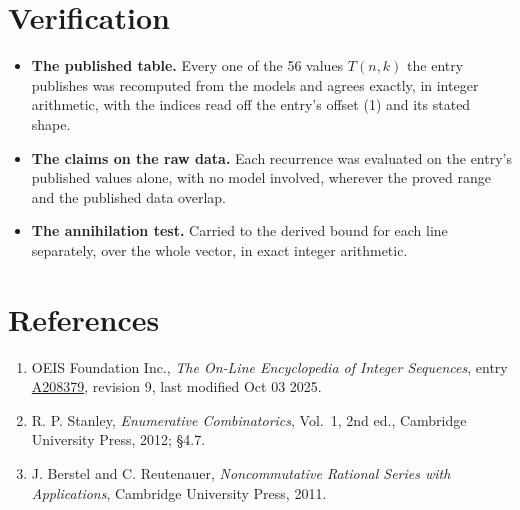 \documentclass[11pt]{article}
\theoremstyle{definition}
\begin{document}
\section{Verification}

\begin{itemize}

\item {\bfseries The published table.} Every one of the 56 values $T(n,k)$ the entry publishes was recomputed from the models and agrees exactly, in integer arithmetic, with the indices read off the entry's offset (1) and its stated shape.

\item {\bfseries The claims on the raw data.} Each recurrence was evaluated on the entry's published values alone, with no model involved, wherever the proved range and the published data overlap.

\item {\bfseries The annihilation test.} Carried to the derived bound for each line separately, over the whole vector, in exact integer arithmetic.

\end{itemize}

\section{References}

\begin{enumerate}

\item OEIS Foundation Inc., \emph{The On-Line Encyclopedia of Integer Sequences}, entry \href{https://oeis.org/A208379}{A208379}, revision 9, last modified Oct 03 2025.

\item R. P. Stanley, \emph{Enumerative Combinatorics}, Vol.~1, 2nd ed., Cambridge University Press, 2012; \S4.7.

\item J. Berstel and C. Reutenauer, \emph{Noncommutative Rational Series with Applications}, Cambridge University Press, 2011.

\end{enumerate}
\end{document}
